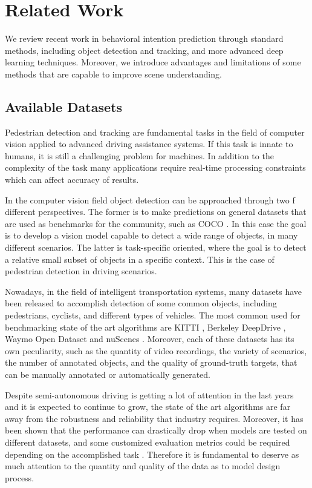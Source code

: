 \chapter{Related Work}
We review recent work in behavioral intention prediction through standard 
methods, including object detection and tracking, and more advanced deep learning 
techniques. Moreover, we introduce advantages and limitations of some methods 
that are capable to improve scene understanding.

\section{Available Datasets}
Pedestrian detection and tracking are fundamental tasks in the field of computer 
vision applied to advanced driving assistance systems. If this task is innate 
to humans, it is still a challenging problem for machines. In addition to the 
complexity of the task many applications require real-time processing 
constraints which can affect accuracy of results. 

In the computer vision field object detection can be approached through two f
different perspectives. The former is to make predictions on general datasets 
that are used as benchmarks for the community, such as COCO \cite{coco}.
In this case the goal is to develop a vision model capable to detect a wide 
range of objects, in many different scenarios.
The latter is task-specific oriented, where the goal is to detect a relative 
small subset of objects in a specific context. This is the case of pedestrian 
detection in driving scenarios.

Nowadays, in the field of intelligent transportation systems, many datasets 
have been released to accomplish detection of some common objects, including 
pedestrians, cyclists, and different types of vehicles.
The most common used for benchmarking state of the art algorithms are KITTI 
\cite{kitti}, Berkeley DeepDrive \cite{bdd100k}, Waymo Open Dataset 
\cite{waymo} and nuScenes \cite{nuscenes}. Moreover, each of these datasets 
has its own peculiarity, such as the quantity of video recordings, the variety 
of scenarios, the number of annotated objects, and the quality of ground-truth 
targets, that can be manually annotated or automatically generated.

Despite semi-autonomous driving is getting a lot of attention in the last years 
and it is expected to continue to grow, the state of the art algorithms are far 
away from the robustness and reliability that industry requires. Moreover, it 
has been shown that the performance can drastically drop when models are tested 
on different datasets, and some customized evaluation metrics could be required 
depending on the accomplished task \cite{uricar2019challenges}.
Therefore it is fundamental to deserve as much attention to the quantity and quality of the data 
as to model design process.

